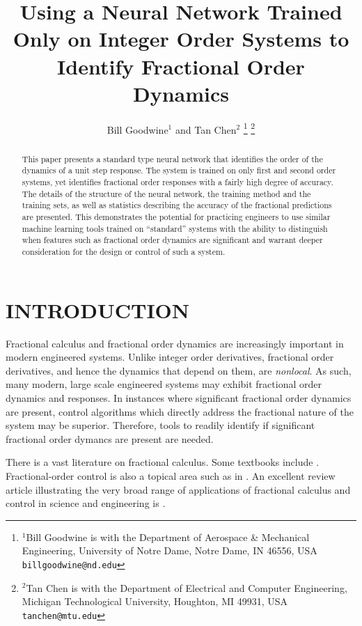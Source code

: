 \documentclass[letterpaper, 10 pt, conference]{ieeeconf}  %
\title{\LARGE \bf
Using a Neural Network Trained Only on Integer Order Systems to Identify
Fractional Order Dynamics}
\author{Bill Goodwine$^{1}$ and Tan Chen$^{2}$%
\thanks{$^{1}$Bill Goodwine is with the Department of Aerospace \& Mechanical
  Engineering, University of Notre Dame, Notre Dame, IN 46556, USA
{\tt\small billgoodwine@nd.edu}}%
\thanks{$^{2}$Tan Chen is with the Department of Electrical and Computer
Engineering, Michigan Technological University, Houghton, MI 49931, USA
{\tt\small tanchen@mtu.edu}}
}
\begin{document}
\maketitle
\thispagestyle{empty}
\pagestyle{empty}

\begin{abstract}

  This paper presents a standard type neural network that identifies the order
  of the dynamics of a unit step response. The system is trained on only first
  and second order systems, yet identifies fractional order responses with a
  fairly high degree of accuracy. The details of the structure of the neural
  network, the training method and the training sets,  as well as statistics
  describing the accuracy of the fractional predictions are presented.  This
  demonstrates the potential for practicing engineers to use similar machine
  learning tools trained on ``standard'' systems with the ability to distinguish
  when features such as fractional order dynamics are significant and warrant
  deeper consideration for the design or control of such a system. 

\end{abstract}


\section{INTRODUCTION}

  Fractional calculus and fractional order dynamics are increasingly important
  in modern engineered systems. Unlike integer order derivatives, fractional
  order derivatives, and hence the dynamics that depend on them, are
  \emph{nonlocal}. As such, many modern, large scale engineered systems may
  exhibit fractional order dynamics and responses. In instances where
  significant fractional order dynamics are present, control algorithms which
  directly address the fractional nature of the system may be superior.
  Therefore, tools to readily identify if significant fractional order dymancs
  are present are needed.

  There is a vast literature on fractional calculus. Some textbooks include
  \cite{fracbook,fracbook2,oustaloup}.  Fractional-order control is also a
  topical area such as in \cite{fraccontrol,YQChenAcc}. An excellent review
  article illustrating the very broad range of applications of fractional
  calculus and control in science and engineering is \cite{SUN2018213}.
\end{document}

